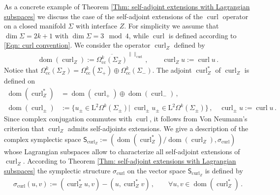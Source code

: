 \begin{Example}\label{Ex: curl example}
	As a concrete example of Theorem \ref{Thm: self-adjoint extensions with Lagrangian subspaces} we discuss the case of the self-adjoint extensions of the $\operatorname{curl}$ operator on a closed manifold $\Sigma$ with interface $Z$.
	For simplicity we assume that $\dim\Sigma=2k+1$ with $\dim\Sigma=3\mod 4$, while $\operatorname{curl}$ is defined according to \eqref{Eqn: curl convention}.
	We consider the operator $\operatorname{curl}_Z$ defined by
	\begin{align}\label{Eqn: Z-curl operator}
		\operatorname{dom}(\operatorname{curl}_Z):=\overline{\Omega_\mathrm{cc}^k(\Sigma_Z)}^{\|\|_{\operatorname{curl}}}\,,\qquad
		\operatorname{curl}_Zu:=\operatorname{curl}u\,.
	\end{align}
	Notice that $\Omega_\mathrm{cc}^k(\Sigma_Z)=\Omega_\mathrm{cc}^k(\Sigma_+)\oplus \Omega_\mathrm{cc}^k(\Sigma_-)$.
	The adjoint $\operatorname{curl}_Z^*$ of $\operatorname{curl}_Z$ is defined on
	\begin{align}\label{Eqn: adjoint of Z-curl operator}
		\operatorname{dom}(\operatorname{curl}_Z^*)&=
		\operatorname{dom}(\operatorname{curl}_+)\oplus\operatorname{dom}(\operatorname{curl}_-)\,,\\
		\operatorname{dom}(\operatorname{curl}_\pm)&:=\lbrace
		u_\pm\in\mathrm{L}^2\Omega^k(\Sigma_\pm)|\;\operatorname{curl}_\pm u_\pm\in\mathrm{L}^2\Omega^k(\Sigma_\pm)\rbrace\,,\quad
		\operatorname{curl}_\pm u:=\operatorname{curl}u\,.
	\end{align}
	Since complex conjugation commutes with $\operatorname{curl}$, it follows from Von Neumann's criterion \parencite[Thm. 5.43]{Moretti-18} that $\operatorname{curl}_Z$ admits self-adjoints extensions.
	We give a description of the complex symplectic space $\mathsf{S}_{\operatorname{curl}_Z}:=(\operatorname{dom}(\operatorname{curl}_Z^*)/\operatorname{dom}(\operatorname{curl}_Z),\sigma_{\operatorname{curl}})$ whose Lagrangian subspaces allow to characterize all self-adjoint extensions of $\operatorname{curl}_Z$.
	According to Theorem \ref{Thm: self-adjoint extensions with Lagrangian subspaces} the symplectic structure $\sigma_{\operatorname{curl}}$ on the vector space $\mathsf{S}_{\operatorname{curl}_Z}$ is defined by
	\begin{align}\label{Eqn: presymplectic structure over the adjoint of Z-curl operator}
		\sigma_{\operatorname{curl}}(u,v):=
		(\operatorname{curl}_Z^*u,v)-(u,\operatorname{curl}_Z^*v)\,,\qquad
		\forall u,v\in\operatorname{dom}(\operatorname{curl}_Z^*)\,.

\end{align}
\end{Example}
